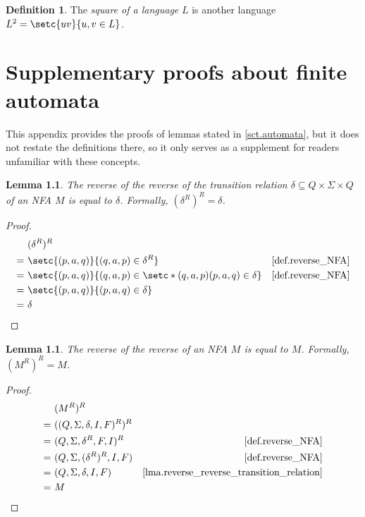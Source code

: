 \documentclass{report}
\newtheorem{lemma}[theorem]{Lemma}
\theoremstyle{definition}
\newtheorem{definition}[theorem]{Definition}
\begin{document}
\begin{appendices}
\begin{definition} \label{def.square_language}
The \emph{square of a language} $L$ is another language
$L^2 = \setc{uv}{u, v \in L}$.
\end{definition}

\chapter{Supplementary proofs about finite automata}
\label{app.proofs_automata}

This appendix provides the proofs of lemmas stated in \cref{sct.automata},
but it does not restate the definitions there, so it only serves as a supplement
for readers unfamiliar with these concepts.

\begin{lemma} \label{lma.reverse_reverse_transition_relation}
The reverse of the reverse of the transition relation
$\delta \subseteq Q \times \Sigma \times Q$ of an NFA $M$ is equal to $\delta$.
Formally, $(\delta^R)^R = \delta$.
\end{lemma}

\begin{proof}
\begin{align*}
& (\delta^R)^R \\
= \ & \setc{(p, a, q)}{(q, a, p) \in \delta^R}
& \text{\cref{def.reverse_NFA}} \\
= \ & \setc{(p, a, q)}{(q, a, p) \in \setc*{(q, a, p)}{(p, a, q) \in \delta}}
& \text{\cref{def.reverse_NFA}} \\
= \ & \setc{(p, a, q)}{(p, a, q) \in \delta} \\
= \ & \delta
\end{align*}
\end{proof}

\begin{lemma} \label{lma.reverse_reverse_NFA}
The reverse of the reverse of an NFA $M$ is equal to $M$. Formally, $(M^R)^R = M$.
\end{lemma}

\begin{proof}
\begin{align*}
& (M^R)^R \\
= \ & ((Q, \Sigma, \delta, I, F)^R)^R \\
= \ & (Q, \Sigma, \delta^R, F, I)^R &
\text{\cref{def.reverse_NFA}} \\
= \ & (Q, \Sigma, (\delta^R)^R, I, F) &
\text{\cref{def.reverse_NFA}} \\
= \ & (Q, \Sigma, \delta, I, F) &
\text{\cref{lma.reverse_reverse_transition_relation}} \\
= \ & M
\end{align*}
\end{proof}


\end{appendices}
\end{document}
